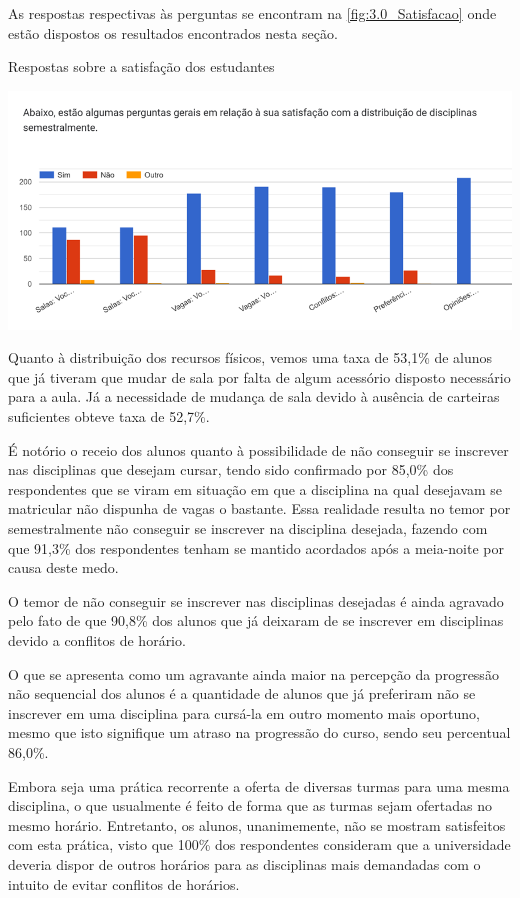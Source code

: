 As respostas respectivas às perguntas se encontram na \autoref{fig:3.0_Satisfacao} onde estão dispostos os resultados encontrados nesta seção.

\begin{MyCenteredFigure}
  \caption{Respostas sobre a satisfação dos estudantes}
  \label{fig:3.0_Satisfacao}
  \includegraphics[width=\textwidth]{files/img/Forms/3.0-Satisfacao}
\end{MyCenteredFigure} %

Quanto à distribuição dos recursos físicos, vemos uma taxa de 53,1\% de alunos que já tiveram que mudar de sala por falta de algum acessório disposto necessário para a aula. Já a necessidade de mudança de sala devido à ausência de carteiras suficientes obteve taxa de 52,7\%.

É notório o receio dos alunos quanto à possibilidade de não conseguir se inscrever nas disciplinas que desejam cursar, tendo sido confirmado por 85,0\% dos respondentes que se viram em situação em que a disciplina na qual desejavam se matricular não dispunha de vagas o bastante. Essa realidade resulta no temor por semestralmente não conseguir se inscrever na disciplina desejada, fazendo com que 91,3\% dos respondentes tenham se mantido acordados após a meia-noite por causa deste medo.

O temor de não conseguir se inscrever nas disciplinas desejadas é ainda agravado pelo fato de que 90,8\% dos alunos que já deixaram de se inscrever em disciplinas devido a conflitos de horário.

O que se apresenta como um agravante ainda maior na percepção da progressão não sequencial dos alunos é a quantidade de alunos que já preferiram não se inscrever em uma disciplina para cursá-la em outro momento mais oportuno, mesmo que isto signifique um atraso na progressão do curso, sendo seu percentual 86,0\%.

Embora seja uma prática recorrente a oferta de diversas turmas para uma mesma disciplina, o que usualmente é feito de forma que as turmas sejam ofertadas no mesmo horário. Entretanto, os alunos, unanimemente, não se mostram satisfeitos com esta prática, visto que 100\% dos respondentes consideram que a universidade deveria dispor de outros horários para as disciplinas mais demandadas com o intuito de evitar conflitos de horários.

